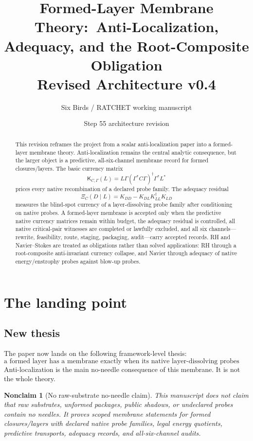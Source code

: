 \documentclass[11pt]{article}
\title{Formed-Layer Membrane Theory:\ Anti-Localization, Adequacy, and the Root-Composite Obligation\\\large Revised Architecture v0.4}
\author{Six Birds / RATCHET working manuscript}
\date{Step 55 architecture revision}
\newtheorem{nonclaim}[theorem]{Nonclaim}
\newcommand{\K}{\mathsf K}
\begin{document}
\maketitle

\begin{abstract}
This revision reframes the project from a scalar anti-localization paper into a formed-layer membrane theory.  Anti-localization remains the central analytic consequence, but the larger object is a predictive, all-six-channel membrane record for formed closures/layers.  The basic currency matrix
\[
  \K_{C,\Gamma}(L)=L\Gamma(\Gamma^*C\Gamma)^\dagger\Gamma^*L^*
\]
prices every native recombination of a declared probe family.  The adequacy residual
\[
  \Xi_C(D\mid L)=K_{DD}-K_{DL}K_{LL}^\dagger K_{LD}
\]
measures the blind-spot currency of a layer-dissolving probe family after conditioning on native probes.  A formed-layer membrane is accepted only when the predictive native currency matrices remain within budget, the adequacy residual is controlled, all native critical-pair witnesses are completed or lawfully excluded, and all six channels---rewrite, feasibility, route, staging, packaging, audit---carry accepted records.  RH and Navier--Stokes are treated as obligations rather than solved applications: RH through a root-composite anti-invariant currency collapse, and Navier through adequacy of native energy/enstrophy probes against blow-up probes.
\end{abstract}

\tableofcontents

\section{The landing point}

\subsection{New thesis}
The paper now lands on the following framework-level thesis:
\[
\boxed{\text{a formed layer has a membrane exactly when its native layer-dissolving probes are predictively priced.}}
\]
Anti-localization is the main no-needle consequence of this membrane.  It is not the whole theory.

\begin{nonclaim}[No raw-substrate no-needle claim]
This manuscript does not claim that raw substrates, unformed packages, public shadows, or undeclared probes contain no needles.  It proves scoped membrane statements for formed closures/layers with declared native probe families, legal energy quotients, predictive transports, adequacy records, and all-six-channel audits.
\end{nonclaim}
\end{document}
